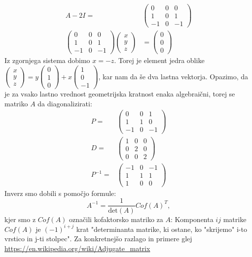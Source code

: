 \documentclass{article}
\begin{document}
\begin{align*}
A-2I  =&
\begin{pmatrix}
0 & 0 & 0 \\
1  & 0 & 1 \\
-1 & 0 & -1
\end{pmatrix} \\
\begin{pmatrix}
0 & 0 & 0 \\
1  & 0 & 1 \\
-1 & 0 & -1
\end{pmatrix}
\begin{pmatrix}
x \\ y \\ z \end{pmatrix} &= \begin{pmatrix} 0 \\ 0 \\ 0\end{pmatrix}
\end{align*}
Iz zgornjega sistema dobimo $x=-z$. 
Torej je element jedra oblike $\begin{pmatrix} x \\ y \\ z \end{pmatrix} = y \begin{pmatrix} 0 \\ 1 \\ 0 \end{pmatrix} + x \begin{pmatrix}1 \\ 0 \\ -1 \end{pmatrix}$, kar nam da še dva lastna vektorja. Opazimo, da je za vsako lastno vrednost geometrijska kratnost enaka algebraični, torej se matriko $A$ da diagonalizirati:
\begin{align*}
P  =&
\begin{pmatrix}
0 & 0 & 1\\
1  & 1 & 0 \\
-1 & 0 & -1
\end{pmatrix} \\
D =& 
\begin{pmatrix}
1 & 0 & 0 \\
0  & 2 & 0 \\
0 & 0 & 2
\end{pmatrix} \\
P^{-1} =& 
\begin{pmatrix}
-1 & 0 & -1\\
1  & 1 & 1 \\
1 & 0 & 0
\end{pmatrix}
\end{align*}
Inverz smo dobili s pomočjo formule:
\begin{equation*}
A^{-1} = \frac{1}{\mathrm{det}(A)} Cof(A)^T ,
\end{equation*}
kjer smo z $Cof(A)$ označili kofaktorsko matriko za $A$: Komponenta $ij$ matrike $Cof(A)$ je $(-1)^{i+j}$ krat "{}determinanta matrike, ki ostane, ko "{}skrijemo"{} i-to vrstico in j-ti stolpec"{}. Za konkretnejšo razlago in primere glej \href{https://en.wikipedia.org/wiki/Adjugate\_matrix}{https://en.wikipedia.org/wiki/Adjugate\_matrix} 
\end{document}
